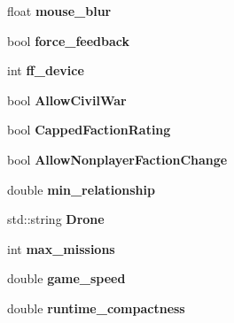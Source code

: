 \begin{DoxyCompactItemize}
\item 
float {\bfseries mouse\+\_\+blur}\hypertarget{classvs__options_a03e920ed6e8e64a73de3e3c569038604}{}\label{classvs__options_a03e920ed6e8e64a73de3e3c569038604}

\item 
bool {\bfseries force\+\_\+feedback}\hypertarget{classvs__options_aec780db7e294349e93acfc36c27b0f3c}{}\label{classvs__options_aec780db7e294349e93acfc36c27b0f3c}

\item 
int {\bfseries ff\+\_\+device}\hypertarget{classvs__options_acb137258cd757953792139826990f3bc}{}\label{classvs__options_acb137258cd757953792139826990f3bc}

\item 
bool {\bfseries Allow\+Civil\+War}\hypertarget{classvs__options_ac420fafa0e3bd8644b26186232195b2e}{}\label{classvs__options_ac420fafa0e3bd8644b26186232195b2e}

\item 
bool {\bfseries Capped\+Faction\+Rating}\hypertarget{classvs__options_a9cb8aecebf1f74ab07a48cce70efd382}{}\label{classvs__options_a9cb8aecebf1f74ab07a48cce70efd382}

\item 
bool {\bfseries Allow\+Nonplayer\+Faction\+Change}\hypertarget{classvs__options_a34eb51769f65b24d2c7e0177d0aa20bd}{}\label{classvs__options_a34eb51769f65b24d2c7e0177d0aa20bd}

\item 
double {\bfseries min\+\_\+relationship}\hypertarget{classvs__options_a61721f2847f7740e1fbac695fe6e266a}{}\label{classvs__options_a61721f2847f7740e1fbac695fe6e266a}

\item 
std\+::string {\bfseries Drone}\hypertarget{classvs__options_a96b304a461bcf1ef80cf57262c7f2e27}{}\label{classvs__options_a96b304a461bcf1ef80cf57262c7f2e27}

\item 
int {\bfseries max\+\_\+missions}\hypertarget{classvs__options_a5dda4a404976f51afeda5964d8b1390f}{}\label{classvs__options_a5dda4a404976f51afeda5964d8b1390f}

\item 
double {\bfseries game\+\_\+speed}\hypertarget{classvs__options_ac18f9225e6bc6f40b518e26724dd1886}{}\label{classvs__options_ac18f9225e6bc6f40b518e26724dd1886}

\item 
double {\bfseries runtime\+\_\+compactness}\hypertarget{classvs__options_aeffc007df41970659f8859f6c04926a2}{}\label{classvs__options_aeffc007df41970659f8859f6c04926a2}


\end{DoxyCompactItemize}
